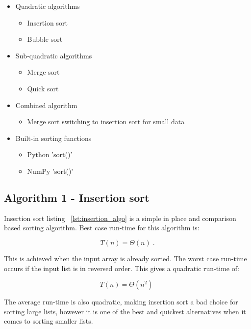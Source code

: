 \documentclass[sigconf, nonacm, natbib, screen, balance=False]{acmart}
\begin{document}
\begin{itemize}

\item Quadratic algorithms
  \begin{itemize}
  \item Insertion sort
  \item Bubble sort
  \end{itemize}
\item Sub-quadratic algorithms
  \begin{itemize}
  \item Merge sort
  \item Quick sort
  \end{itemize}
\item Combined algorithm
  \begin{itemize}
  \item Merge sort switching to insertion sort for small data
  \end{itemize}
\item Built-in sorting functions
  \begin{itemize}
  \item Python 'sort()'
  \item NumPy 'sort()'
  \end{itemize}
\end{itemize}

\subsection{Algorithm 1 - Insertion sort}\label{sec:algo1}
Insertion sort listing ~\ref{lst:insertion_algo} is a simple in place and comparison based sorting algorithm. Best case run-time for this algorithm is:

\begin{equation}
  T(n) = \Theta(n) \;.  \label{eq:ins_sort_best}
\end{equation}

This is achieved when the input array is already sorted. The worst case run-time occurs if the input list is in reversed order. This gives a quadratic run-time of:

\begin{equation}
  T(n) = \Theta(n^2) \;  \label{eq:ins_sort_worst}
\end{equation}

The average run-time is also quadratic, making insertion sort a bad choice for sorting large lists, however it is one of the best and quickest alternatives when it comes to sorting smaller lists. 
\end{document}

